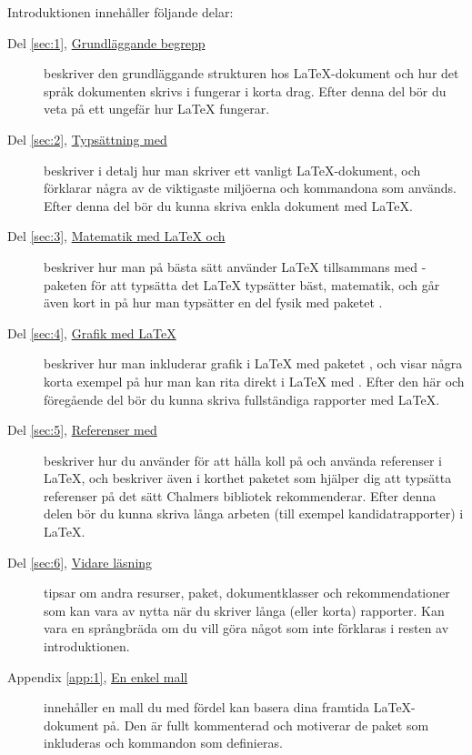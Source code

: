 \documentclass[../../a4.tex]{subfiles}
\begin{document}
Introduktionen innehåller följande delar:
\begin{description}
	\item[{Del \ref{sec:1}, \hyperref[sec:1]{Grundläggande begrepp}}]
	beskriver den grundläggande strukturen hos \LaTeX-dokument och hur det
	språk dokumenten skrivs i fungerar i korta drag. Efter denna del bör
	du veta på ett ungefär hur \LaTeX{} fungerar.
	
	\item[{Del \ref{sec:2}, \hyperref[sec:2]{Typsättning med \pdfLaTeX}}]
	beskriver i detalj hur man skriver ett vanligt
	\LaTeX-dokument, och förklarar några av de viktigaste miljöerna
	och kommandona som används. Efter denna del bör du kunna skriva enkla
	dokument med \LaTeX.
	
	\item[{Del \ref{sec:3}, \hyperref[sec:3]{Matematik med \LaTeX{} och 
	\AmS}}]
	beskriver hur man på bästa sätt använder \LaTeX{} tillsammans med
	\AmS-paketen för att typsätta det \LaTeX{} typsätter bäst, matematik,
	och går även kort in på hur man typsätter en del fysik med paketet
	.
	
	\item[{Del \ref{sec:4}, \hyperref[sec:4]{Grafik med \LaTeX}}]
	beskriver hur man inkluderar grafik i \LaTeX{} med paketet
	, och visar några korta exempel på hur man kan rita
	direkt i \LaTeX{} med \PGFTikZ{}. Efter den här och föregående del bör
	du kunna skriva fullständiga rapporter med \LaTeX.
	
	\item[{Del \ref{sec:5}, \hyperref[sec:5]{Referenser med \BibTeX}}]
	beskriver hur du använder \BibTeX{} för att hålla koll på och använda
	referenser i \LaTeX, och beskriver även i korthet paketet  som
	hjälper dig att typsätta referenser på det sätt Chalmers bibliotek
	rekommenderar. Efter denna delen bör du kunna skriva långa arbeten
	(till exempel kandidatrapporter) i \LaTeX.
	
	\item[{Del \ref{sec:6}, \hyperref[sec:6]{Vidare läsning}}]
	tipsar om andra resurser, paket, dokumentklasser och rekommendationer
	som kan vara av nytta när du skriver långa (eller korta) rapporter.
	Kan vara en språngbräda om du vill göra något som inte förklaras i
	resten av introduktionen.
	
	\item[Appendix \ref{app:1}, {\hyperref[app:1]{En enkel mall}}]
	innehåller en mall du med fördel kan basera dina framtida 
	\LaTeX{}-dokument
	på. Den är fullt kommenterad och motiverar de paket som inkluderas och
	kommandon som definieras.
\end{description}
\end{document}

